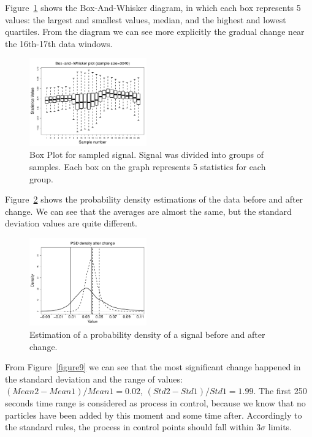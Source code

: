 Figure~\ref{figure7} shows the Box-And-Whisker diagram, in which each box represents 5 values: the largest and smallest values, median, and the highest and lowest quartiles. From the diagram we can see more explicitly the gradual change near the 16th-17th data windows.

\begin{figure}[htb!]
\includegraphics[width=0.45\textwidth]{pics/cfb_paper/PSD/PSDboxplot}
\caption{Box Plot for sampled signal. Signal was divided into groups of samples. Each box
on the graph represents 5 statistics for each group.}\label{figure7}
\end{figure}

Figure~\ref{figure8} shows the probability density estimations of the data before and after change. We can see that the averages are almost the same, but the standard deviation values are quite different.

\begin{figure}[htb!]
\includegraphics[width=0.45\textwidth]{pics/cfb_paper/PSD/PSDdensity}
\caption{Estimation of a probability density of a signal before and after change.}\label{figure8}
\end{figure}

From Figure~\ref{figure9} we can see that the most significant change happened in the standard deviation and the range of values:
$(Mean2 - Mean1)/Mean1 = 0.02$, $(Std2 - Std1)/Std1 = 1.99$. The first 250 seconds time range is considered as process in control, because we know that no particles have been added by this moment and some time after. Accordingly to the standard rules, the process in control points should fall within $3\sigma$ limits. 

